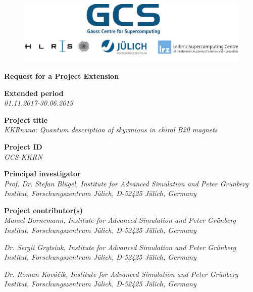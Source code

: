 \documentclass [a4paper, 12pt]{article}
\begin{document}
 
\begin{figure}[h!]
\begin{center}
  \includegraphics[scale=0.45]{Figures/GCS-hlrs-fzj-lrz.jpg}\\
\end{center}
\end{figure}

\begin{center}
{\LARGE \bf Request for a Project Extension} \\

\bigskip
\bigskip
\bigskip
\end{center}
\textbf{Extended period}\\
\phantom{MM}\textit{01.11.2017-30.06.2019}

\bigskip
\textbf{Project title}\\
\phantom{MM}\textit{KKRnano: Quantum description of skyrmions in chiral B20 magnets}


\bigskip
\textbf{Project ID}\\
\phantom{MM} \textit{GCS-KKRN}

\bigskip
\textbf{Principal investigator}\\
\phantom{MM} \textit{ Prof. Dr. Stefan Bl{\"u}gel,
Institute for Advanced Simulation and Peter Gr\"unberg Institut, Forschungszentrum J\"ulich, D-52425 J\"ulich, Germany
}

\bigskip
\textbf{Project contributor(s)}\\

\phantom{MM} \textit{Marcel Bornemann,
Institute for Advanced Simulation and Peter Gr\"unberg Institut, Forschungszentrum J\"ulich, D-52425 J\"ulich, Germany
}

\phantom{MM} \textit{Dr. Sergii Grytsiuk,
Institute for Advanced Simulation and Peter Gr\"unberg Institut, Forschungszentrum J\"ulich, D-52425 J\"ulich, Germany
}

\phantom{MM} \textit{Dr. Roman Kováčik,
Institute for Advanced Simulation and Peter Gr\"unberg Institut, Forschungszentrum J\"ulich, D-52425 J\"ulich, Germany
}
\end{document}
